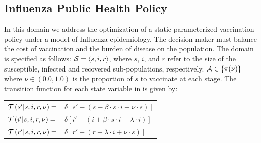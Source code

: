 
\subsection{Influenza Public Health Policy}
\label{sec:results_influenza}

In this domain we address the optimization of a static parameterized vaccination policy under a model of Influenza epidemiology. The decision maker must balance the cost of vaccination and the burden of disease on the population. The domain is specified as follows: {\footnotesize $ \mathcal{S} = \left\langle s, i, r \right\rangle$}, where $ s $, $ i $, and $ r $ refer to the size of the susceptible, infected and recovered sub-populations, respectively. {\footnotesize $ \mathcal{A} \in \left\lbrace \pi(\nu) \right\rbrace $} where {\footnotesize $\nu \in \left(0.0, 1.0\right)$} is the proportion of $ s $ to vaccinate at each stage. The transition function {\footnotesize \Transition} for each state variable in {\footnotesize \State} is given by:
    {\footnotesize 
        \abovedisplayskip=5pt
        \belowdisplayskip=0pt
        \renewcommand{\arraystretch}{1.5}
        \begin{tabular}{ll}
            $ \mathcal{T}\left( s' | s, i, r, \nu \right) =$ & $ \delta \left[ s' - (s - \beta \cdot s \cdot i - \nu \cdot s) \right] $ \\
            $ \mathcal{T}\left( i' | s, i, r, \nu \right) =$ & $ \delta \left[ i' - (i + \beta \cdot s \cdot i - \lambda \cdot i) \right] $ \\
            $ \mathcal{T}\left( r' | s, i, r, \nu \right) =$ & $ \delta \left[ r' - (r + \lambda \cdot i + \nu \cdot s) \right] $ \\            
        \end{tabular}
    }%
   

